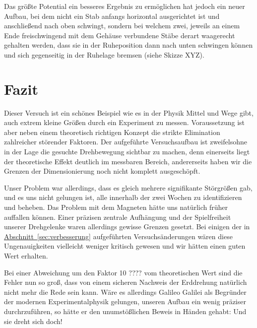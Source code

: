 \documentclass[11pt]{scrartcl}
\newcommand{\hypref}[2]{\hyperref[#2]{{#1}~\ref{#2}}}
\begin{document}
Das größte Potential ein besseres Ergebnis zu ermöglichen hat jedoch ein neuer Aufbau, bei dem nicht ein Stab anfangs horizontal ausgerichtet ist und anschließend nach oben schwingt, sondern bei welchem zwei, jeweils an einem Ende freischwingend mit dem Gehäuse verbundene Stäbe derart waagerecht gehalten werden, dass sie in der Ruheposition dann nach unten schwingen können und sich gegenseitig in der Ruhelage bremsen (siehe Skizze XYZ).


\section{Fazit} %
Dieser Versuch ist ein schönes Beispiel wie es in der Physik Mittel und Wege gibt, auch extrem kleine Größen durch ein Experiment zu messen.
Voraussetzung ist aber neben einem theoretisch richtigen Konzept die strikte Elimination zahlreicher störender Faktoren.
Der aufgeführte Versuchsaufbau ist zweifelsohne in der Lage die gesuchte Drehbewegung sichtbar zu machen, denn einerseits liegt der theoretische Effekt deutlich im messbaren Bereich, andererseits haben wir die Grenzen der Dimensionierung noch nicht komplett ausgeschöpft.

Unser Problem war allerdings, dass es gleich mehrere signifikante Störgrößen gab, und es uns nicht gelungen ist, alle innerhalb der zwei Wochen zu identifizieren und beheben.
Das Problem mit dem Magneten hätte uns natürlich früher auffallen können.
Einer präzisen zentrale Aufhängung und der Spielfreiheit unserer Drehgelenke waren allerdings gewisse Grenzen gesetzt.
Bei einigen der in \hypref{Abschnitt}{sec:verbesserung} aufgeführten Versuchsänderungen wären diese Ungenauigkeiten vielleicht weniger kritisch gewesen und wir hätten einen guten Wert erhalten.

Bei einer Abweichung um den Faktor 10 ???? vom theoretischen Wert sind die Fehler nun so groß, dass von einem sicheren Nachweis der Erddrehung natürlich nicht mehr die Rede sein kann.
Wäre es allerdings Galileo Galilei als Begründer der modernen Experimentalphysik gelungen, unseren Aufbau ein wenig präziser durchrzuführen, so hätte er den unumstößlichen Beweis in Händen gehabt:
Und sie dreht sich doch!
\end{document}
